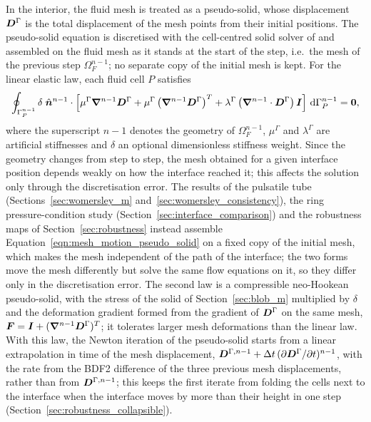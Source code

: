 In the interior, the fluid mesh is treated as a pseudo-solid, whose displacement $\boldsymbol{D}^{\Gamma}$ is the total displacement of the mesh points from their initial positions.
The pseudo-solid equation is discretised with the cell-centred solid solver of \citet{Cardiff2026} and assembled on the fluid mesh as it stands at the start of the step, i.e.\ the mesh of the previous step $\Omega_F^{n-1}$; no separate copy of the initial mesh is kept.
For the linear elastic law, each fluid cell $P$ satisfies
\begin{equation}
    \oint_{\Gamma^{n-1}_{P}}
    \delta \;
    \hat{\boldsymbol{n}}^{n-1}
    \cdot
    \left[
    \mu^\Gamma
    \boldsymbol{\nabla}^{n-1} \boldsymbol{D}^{\Gamma}
    +
    \mu^\Gamma
    \left(
    \boldsymbol{\nabla}^{n-1} \boldsymbol{D}^{\Gamma}
    \right)^T
    +
    \lambda^\Gamma
    \left(
    \boldsymbol{\nabla}^{n-1} \cdot \boldsymbol{D}^{\Gamma}
    \right)
    \boldsymbol{I}
    \right]
    \, \text{d}\Gamma^{n-1}_{P}
    =
    \boldsymbol{0},
    \label{eqn:mesh_motion_pseudo_solid}
\end{equation}
where the superscript $n-1$ denotes the geometry of $\Omega_F^{n-1}$, $\mu^\Gamma$ and $\lambda^\Gamma$ are artificial stiffnesses and $\delta$ an optional dimensionless stiffness weight.
Since the geometry changes from step to step, the mesh obtained for a given interface position depends weakly on how the interface reached it; this affects the solution only through the discretisation error.
The results of the pulsatile tube (Sections~\ref{sec:womersley_m} and~\ref{sec:womersley_consistency}), the ring pressure-condition study (Section~\ref{sec:interface_comparison}) and the robustness maps of Section~\ref{sec:robustness} instead assemble Equation~\eqref{eqn:mesh_motion_pseudo_solid} on a fixed copy of the initial mesh, which makes the mesh independent of the path of the interface; the two forms move the mesh differently but solve the same flow equations on it, so they differ only in the discretisation error.
The second law is a compressible neo-Hookean pseudo-solid, with the stress of the solid of Section~\ref{sec:blob_m} multiplied by $\delta$ and the deformation gradient formed from the gradient of $\boldsymbol{D}^{\Gamma}$ on the same mesh, $\boldsymbol{F} = \boldsymbol{I} + (\boldsymbol{\nabla}^{n-1}\boldsymbol{D}^{\Gamma})^T$; it tolerates larger mesh deformations than the linear law.
With this law, the Newton iteration of the pseudo-solid starts from a linear extrapolation in time of the mesh displacement, $\boldsymbol{D}^{\Gamma,n-1} + \Delta t\,(\partial\boldsymbol{D}^{\Gamma}/\partial t)^{n-1}$, with the rate from the BDF2 difference of the three previous mesh displacements, rather than from $\boldsymbol{D}^{\Gamma,n-1}$; this keeps the first iterate from folding the cells next to the interface when the interface moves by more than their height in one step (Section~\ref{sec:robustness_collapsible}).

